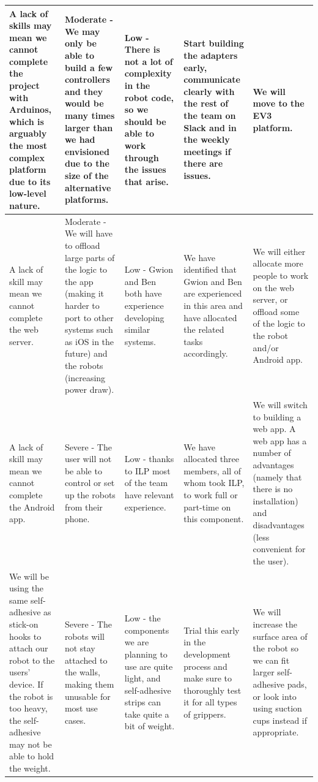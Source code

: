 \documentclass[onecolumn]{IEEEtran}
\begin{document}
\begin{center}
\begin{tabularx}{1.0\linewidth}{|L|L|L|L|L|}
        \hline
        A lack of skills may mean we cannot complete the project with Arduinos, which is arguably the most complex platform due to its low-level nature. & Moderate - We may only be able to build a few controllers and they would be many times larger than we had envisioned due to the size of the alternative platforms. & Low - There is not a lot of complexity in the robot code, so we should be able to work through the issues that arise. & Start building the adapters early, communicate clearly with the rest of the team on Slack and in the weekly meetings if there are issues. & We will move to the EV3 platform. \\
        \hline
        A lack of skill may mean we cannot complete the web server. & Moderate - We will have to offload large parts of the logic to the app (making it harder to port to other systems such as iOS in the future) and the robots (increasing power draw). & Low - Gwion and Ben both have experience developing similar systems. & We have identified that Gwion and Ben are experienced in this area and have allocated the related tasks accordingly. & We will either allocate more people to work on the web server, or offload some of the logic to the robot and/or Android app. \\
        \hline
        A lack of skill may mean we cannot complete the Android app. & Severe - The user will not be able to control or set up the robots from their phone. & Low - thanks to ILP most of the team have relevant experience. & We have allocated three members, all of whom took ILP, to work full or part-time on this component. & We will switch to building a web app. A web app has a number of advantages (namely that there is no installation) and disadvantages (less convenient for the user). \\
        \hline
        We will be using the same self-adhesive as stick-on hooks to attach our robot to the users' device. If the robot is too heavy, the self-adhesive may not be able to hold the weight. & Severe - The robots will not stay attached to the walls, making them unusable for most use cases. & Low - the components we are planning to use are quite light, and self-adhesive strips can take quite a bit of weight. & Trial this early in the development process and make sure to thoroughly test it for all types of grippers. & We will increase the surface area of the robot so we can fit larger self-adhesive pads, or look into using suction cups instead if appropriate. \\
        \hline
    \end{tabularx}
\end{center}
\end{document}
